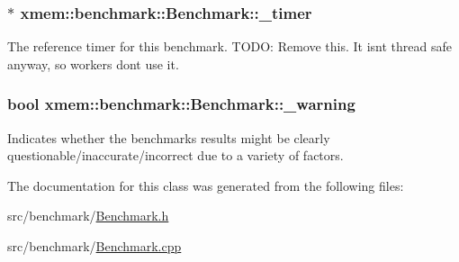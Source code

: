 \subsubsection[{\+\_\+timer}]{$\ast$ xmem\+::benchmark\+::\+Benchmark\+::\+\_\+timer\hspace{0.3cm}{\ttfamily [protected]}}\label{classxmem_1_1benchmark_1_1_benchmark_a673c700cb58ec0bc922f36d95dab12c9}
The reference timer for this benchmark. T\+O\+D\+O\+: Remove this. It isn\textquotesingle{}t thread safe anyway, so workers don\textquotesingle{}t use it. \hypertarget{classxmem_1_1benchmark_1_1_benchmark_af1a72e70f81c91f7c004ae01b2353288}{}
\subsubsection[{\+\_\+warning}]{\setlength{\rightskip}{0pt plus 5cm}bool xmem\+::benchmark\+::\+Benchmark\+::\+\_\+warning\hspace{0.3cm}{\ttfamily [protected]}}\label{classxmem_1_1benchmark_1_1_benchmark_af1a72e70f81c91f7c004ae01b2353288}
Indicates whether the benchmarks results might be clearly questionable/inaccurate/incorrect due to a variety of factors. 

The documentation for this class was generated from the following files\+:\begin{DoxyCompactItemize}
\item 
src/benchmark/\hyperlink{_benchmark_8h}{Benchmark.\+h}\item 
src/benchmark/\hyperlink{_benchmark_8cpp}{Benchmark.\+cpp}\end{DoxyCompactItemize}

